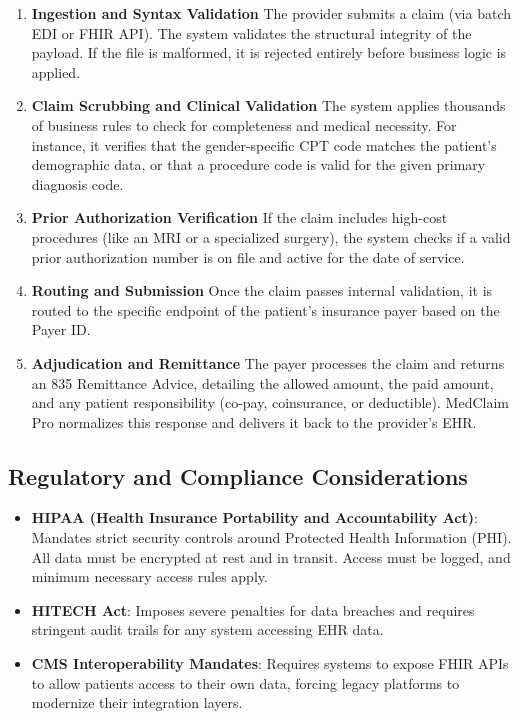 \documentclass[
  11pt,
  openany,
  oneside]{book}
\providecommand{\tightlist}{%
  \setlength{\itemsep}{0pt}\setlength{\parskip}{0pt}}
\begin{document}
\begin{enumerate}
\def\labelenumi{\arabic{enumi}.}
\item
  \textbf{Ingestion and Syntax Validation} The provider submits a claim
  (via batch EDI or FHIR API). The system validates the structural
  integrity of the payload. If the file is malformed, it is rejected
  entirely before business logic is applied.
\item
  \textbf{Claim Scrubbing and Clinical Validation} The system applies
  thousands of business rules to check for completeness and medical
  necessity. For instance, it verifies that the gender-specific CPT code
  matches the patient's demographic data, or that a procedure code is
  valid for the given primary diagnosis code.
\item
  \textbf{Prior Authorization Verification} If the claim includes
  high-cost procedures (like an MRI or a specialized surgery), the
  system checks if a valid prior authorization number is on file and
  active for the date of service.
\item
  \textbf{Routing and Submission} Once the claim passes internal
  validation, it is routed to the specific endpoint of the patient's
  insurance payer based on the Payer ID.
\item
  \textbf{Adjudication and Remittance} The payer processes the claim and
  returns an 835 Remittance Advice, detailing the allowed amount, the
  paid amount, and any patient responsibility (co-pay, coinsurance, or
  deductible). MedClaim Pro normalizes this response and delivers it
  back to the provider's EHR.
\end{enumerate}

\subsection{Regulatory and Compliance
Considerations}\label{regulatory-and-compliance-considerations}

\begin{itemize}
\tightlist
\item
  \textbf{HIPAA (Health Insurance Portability and Accountability Act)}:
  Mandates strict security controls around Protected Health Information
  (PHI). All data must be encrypted at rest and in transit. Access must
  be logged, and minimum necessary access rules apply.
\item
  \textbf{HITECH Act}: Imposes severe penalties for data breaches and
  requires stringent audit trails for any system accessing EHR data.
\item
  \textbf{CMS Interoperability Mandates}: Requires systems to expose
  FHIR APIs to allow patients access to their own data, forcing legacy
  platforms to modernize their integration layers.
\end{itemize}
\end{document}
